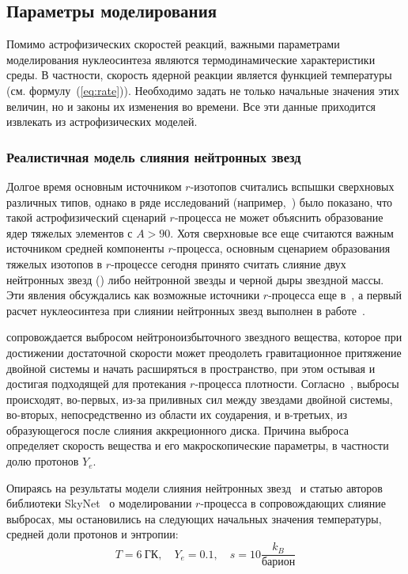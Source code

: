 \subsection{Параметры моделирования}
Помимо астрофизических скоростей реакций, важными параметрами моделирования нуклеосинтеза являются термодинамические характеристики среды. В частности, скорость ядерной реакции является функцией температуры (см. формулу~(\ref{eq:rate})). Необходимо задать не только начальные значения этих величин, но и законы их изменения во времени. Все эти данные приходится извлекать из астрофизических моделей.

\subsubsection{Реалистичная модель слияния нейтронных звезд}
\label{sec:nsm}
Долгое время основным источником $r$-изотопов считались вспышки сверхновых различных типов, однако в ряде исследований (например,~\cite{arcones2007,roberts2010}) было показано, что такой астрофизический сценарий $r$-процесса не может объяснить образование ядер тяжелых элементов с $A > 90$. Хотя сверхновые все еще считаются важным источником средней компоненты $r$-процесса, основным сценарием образования тяжелых изотопов в $r$-процессе сегодня принято считать слияние двух нейтронных звезд (\nsm) либо нейтронной звезды и черной дыры звездной массы. Эти явления обсуждались как возможные источники $r$-процесса еще в~\cite{lattimer1974,lattimer1976,symbalisty1982}, а первый расчет нуклеосинтеза при слиянии нейтронных звезд выполнен в работе~\cite{freiberghaus1999}.

\nsm{} сопровождается выбросом нейтроноизбыточного звездного вещества, которое при достижении достаточной скорости может преодолеть гравитационное притяжение двойной системы и начать расширяться в пространство, при этом остывая и достигая подходящей для протекания $r$-процесса плотности. Согласно~\cite{lippuner2015}, выбросы происходят, во-первых, из-за приливных сил между звездами двойной системы, во-вторых, непосредственно из области их соударения, и в-третьих, из образующегося после слияния аккреционного диска. Причина выброса определяет скорость вещества и его макроскопические параметры, в частности долю протонов $Y_e$.

Опираясь на результаты модели слияния нейтронных звезд~\cite{korobkin2012} и статью авторов библиотеки SkyNet~\cite{lippuner2015} о моделировании $r$-процесса в сопровождающих слияние выбросах, мы остановились на следующих начальных значения температуры, средней доли протонов и энтропии:
\begin{equation}
\displaystyle
T = 6~\text{ГК},\quad Y_e = 0.1,\quad s = 10 \frac{k_B}{\text{барион}}
\end{equation}

